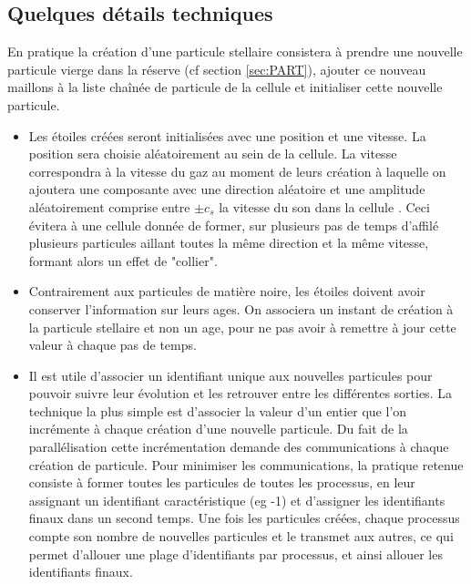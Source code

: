 
\subsection{Quelques détails techniques}
En pratique la création d'une particule stellaire consistera à prendre une nouvelle particule vierge dans la réserve (cf section \ref{sec:PART}), ajouter ce nouveau maillons à la liste chaînée de particule de la cellule et initialiser cette nouvelle particule.

\begin{itemize}

\item Les étoiles créées seront initialisées avec une position et une vitesse.
La position sera choisie aléatoirement au sein de la cellule.
La vitesse correspondra à la vitesse du gaz au moment de leurs création à laquelle on ajoutera une composante avec une direction aléatoire et une amplitude aléatoirement comprise entre $\pm c_s$ la vitesse du son dans la cellule \citep{rasera_history_2006}.
Ceci évitera à une cellule donnée de former, sur plusieurs pas de temps d'affilé plusieurs particules aillant toutes la même direction et la même vitesse, formant alors un effet de "collier".

\item Contrairement aux particules de matière noire, les étoiles doivent avoir conserver l'information sur leurs ages. On associera un instant de création à la particule stellaire et non un age, pour ne pas avoir à remettre à jour cette valeur à chaque pas de temps.


\item Il est utile d'associer un identifiant unique aux nouvelles particules pour pouvoir suivre leur évolution et les retrouver entre les différentes sorties.
La technique la plus simple est d'associer la valeur d'un entier que l'on incrémente à chaque création d'une nouvelle particule.
Du fait de la parallélisation cette incrémentation demande des communications à chaque création de particule.
Pour minimiser les communications, la pratique retenue consiste à former toutes les particules de toutes les processus, en leur assignant un identifiant caractéristique (eg -1) et d'assigner les identifiants finaux dans un second temps.
Une fois les particules créées, chaque processus compte son nombre de nouvelles particules et le transmet aux autres, ce qui permet d'allouer une plage d'identifiants par processus, et ainsi allouer les identifiants finaux.
\end{itemize}


